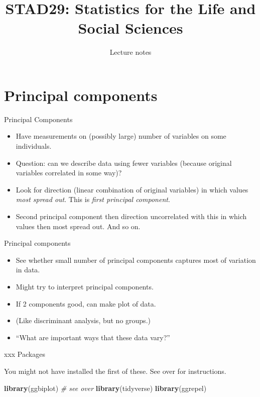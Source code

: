 \documentclass[ignorenonframetext,]{beamer}
\title{STAD29: Statistics for the Life and Social Sciences}
\author{Lecture notes}
\date{}
\newenvironment{Shaded}{\begin{snugshade}}{\end{snugshade}}
\newcommand{\CommentTok}[1]{\textcolor[rgb]{0.56,0.35,0.01}{\textit{#1}}}
\newcommand{\KeywordTok}[1]{\textcolor[rgb]{0.13,0.29,0.53}{\textbf{#1}}}
\newcommand{\NormalTok}[1]{#1}
\begin{document}
\frame{\titlepage}

\hypertarget{principal-components}{%
\section{Principal components}\label{principal-components}}

\begin{frame}{Principal Components}
\protect\hypertarget{principal-components-1}{}

\begin{itemize}
\item
  Have measurements on (possibly large) number of variables on some
  individuals.
\item
  Question: can we describe data using fewer variables (because original
  variables correlated in some way)?
\item
  Look for direction (linear combination of original variables) in which
  values \emph{most spread out}. This is \emph{first principal
  component}.
\item
  Second principal component then direction uncorrelated with this in
  which values then most spread out. And so on.
\end{itemize}

\end{frame}

\begin{frame}{Principal components}
\protect\hypertarget{principal-components-2}{}

\begin{itemize}
\item
  See whether small number of principal components captures most of
  variation in data.
\item
  Might try to interpret principal components.
\item
  If 2 components good, can make plot of data.
\item
  (Like discriminant analysis, but no groups.)
\item
  ``What are important ways that these data vary?''
\end{itemize}

\end{frame}

\begin{frame}[fragile]{xxx Packages}
\protect\hypertarget{xxx-packages}{}

You might not have installed the first of these. See over for
instructions.

\begin{Shaded}
\begin{Highlighting}[]
\KeywordTok{library}\NormalTok{(ggbiplot) }\CommentTok{# see over}
\KeywordTok{library}\NormalTok{(tidyverse)}
\KeywordTok{library}\NormalTok{(ggrepel)}
\end{Highlighting}
\end{Shaded}

\end{frame}
\end{document}
